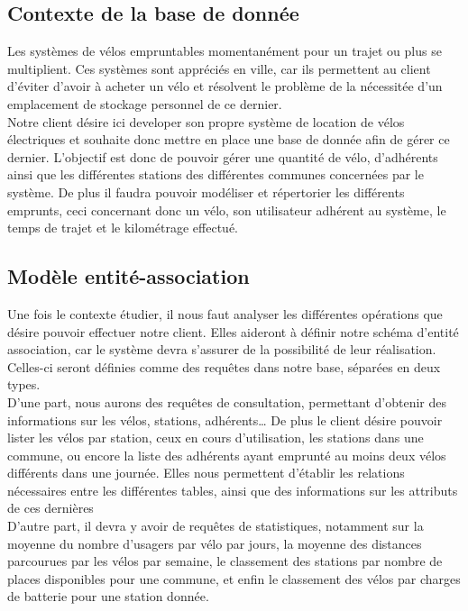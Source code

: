 \documentclass[10pt]{article}
\begin{document}
  \subsection{Contexte de la base de donnée}\label{subsec:contexte}
  Les systèmes de vélos empruntables momentanément pour un trajet ou plus se multiplient.
  Ces systèmes sont appréciés en ville, car ils permettent au client d'éviter d'avoir à acheter un vélo et résolvent le problème
  de la nécessitée d'un emplacement de stockage personnel de ce dernier. \\
  Notre client désire ici developer son propre système de location de vélos électriques et souhaite donc mettre en place une base de
  donnée afin de gérer ce dernier.
  L'objectif est donc de pouvoir gérer une quantité de vélo, d'adhérents ainsi que les différentes stations des différentes communes
  concernées par le système.
  De plus il faudra pouvoir modéliser et répertorier les différents emprunts, ceci concernant donc un vélo, son utilisateur adhérent au système,
  le temps de trajet et le kilométrage effectué.\\

  \subsection{Modèle entité-association}\label{subsec:modele}
  Une fois le contexte étudier, il nous faut analyser les différentes opérations que désire pouvoir effectuer notre client.
  Elles aideront à définir notre schéma d'entité association, car le système devra s'assurer de la possibilité de leur réalisation.
  Celles-ci seront définies comme des requêtes dans notre base, séparées en deux types.\\
  D'une part, nous aurons des requêtes de consultation, permettant d'obtenir des informations sur les vélos, stations, adhérents\dots
  De plus le client désire pouvoir lister les vélos par station, ceux en cours d'utilisation, les stations dans une commune,
  ou encore la liste des adhérents ayant emprunté au moins deux vélos différents dans une journée.
  Elles nous permettent d'établir les relations nécessaires entre les différentes tables, ainsi que des informations sur les attributs de ces dernières\\
  D'autre part, il devra y avoir de requêtes de statistiques, notamment sur la moyenne du nombre d'usagers par vélo par jours,
  la moyenne des distances parcourues par les vélos par semaine, le classement des stations par nombre de places disponibles pour
  une commune, et enfin le classement des vélos par charges de batterie pour une station donnée.\\
\end{document}
